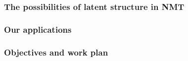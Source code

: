 \documentclass[xetex,aspectratio=169,xcolor,professionalfonts,hyperref]{beamer}
\begin{document}
\begin{frame}
    \frametitle{The possibilities of latent structure in NMT}
\end{frame}

\begin{frame}
    \frametitle{Our applications}
\end{frame}

\begin{frame}
    \frametitle{Objectives and work plan}
\end{frame}

\end{document}
